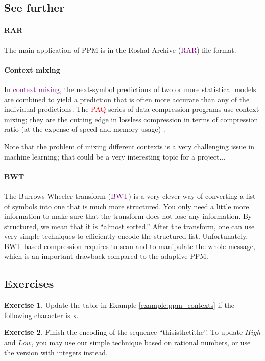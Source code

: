 \documentclass[a4paper, 11pt]{article}
\numberwithin{equation}{section}
\theoremstyle{plain}
\theoremstyle{definition}
\newtheorem{exercise}   {Exercise}  [section]
\newcommand{\Important}[1]{\textcolor{red}{#1}}
\newcommand{\Define}[1]{\textcolor{purple}{#1}}
\begin{document}
\subsection{See further}

\paragraph{RAR} The main application of PPM is in the Roshal Archive (\Define{RAR}) file format. 


\paragraph{Context mixing} In \Define{context mixing}, the next-symbol predictions of two or more statistical models are combined to yield a prediction that is often more accurate than any of the individual predictions. The \Important{PAQ} series of data compression programs use context mixing; they are the cutting edge in lossless compression in terms of compression ratio (at the expense of speed and memory usage) \cite{KF11}. 

Note that the problem of mixing different contexts is a very challenging issue in machine learning; that could be a very interesting topic for a project...


\paragraph{BWT} The Burrows-Wheeler transform (\Define{BWT}) is a very clever way of converting a list of symbols into one that is much more structured. You only need a little more information to make sure that the transform does not lose any information. By structured, we mean that it is ``almost sorted.'' After the transform, one can use very simple techniques to efficiently encode the structured list. Unfortunately, BWT-based compression requires to scan and to manipulate the whole message, which is an important drawback compared to the adaptive PPM.


\subsection{Exercises}


\begin{exercise} \label{exercise:ppm_contexts}
Update the table in Example \ref{example:ppm_contexts} if the following character is x.
\end{exercise}

\begin{exercise}
Finish the encoding of the sequence ``this\textvisiblespace is\textvisiblespace the\textvisiblespace tithe''. To update $High$ and $Low$, you may use our simple technique based on rational numbers, or use the version with integers instead.
\end{exercise}




\end{document}
